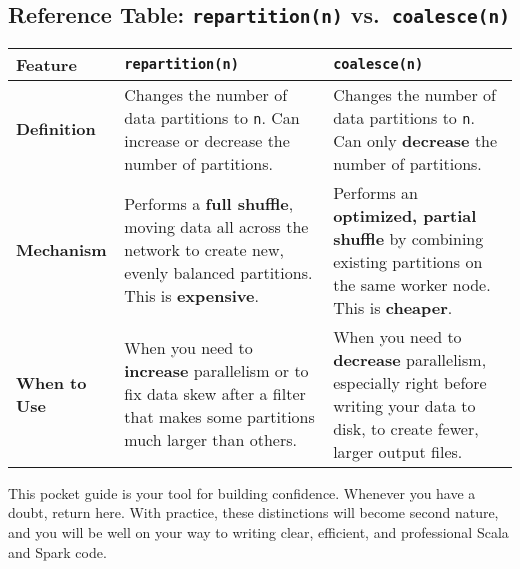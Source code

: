 \documentclass[
  letterpaper,
  DIV=11,
  numbers=noendperiod]{scrreprt}
\begin{document}
\subsection{\texorpdfstring{\textbf{Reference Table:
\texttt{repartition(n)}
vs.~\texttt{coalesce(n)}}}{Reference Table: repartition(n) vs.~coalesce(n)}}\label{reference-table-repartitionn-vs.-coalescen}

\begin{longtable}[]{@{}
  >{\raggedright\arraybackslash}p{}
  >{\raggedright\arraybackslash}p{}
  >{\raggedright\arraybackslash}p{}@{}}
\toprule\noalign{}
\begin{minipage}[b]{\linewidth}\raggedright
Feature
\end{minipage} & \begin{minipage}[b]{\linewidth}\raggedright
\texttt{repartition(n)}
\end{minipage} & \begin{minipage}[b]{\linewidth}\raggedright
\texttt{coalesce(n)}
\end{minipage} \\
\midrule\noalign{}
\endhead
\bottomrule\noalign{}
\endlastfoot
\textbf{Definition} & Changes the number of data partitions to
\texttt{n}. Can increase or decrease the number of partitions. & Changes
the number of data partitions to \texttt{n}. Can only \textbf{decrease}
the number of partitions. \\
\textbf{Mechanism} & Performs a \textbf{full shuffle}, moving data all
across the network to create new, evenly balanced partitions. This is
\textbf{expensive}. & Performs an \textbf{optimized, partial shuffle} by
combining existing partitions on the same worker node. This is
\textbf{cheaper}. \\
\textbf{When to Use} & When you need to \textbf{increase} parallelism or
to fix data skew after a filter that makes some partitions much larger
than others. & When you need to \textbf{decrease} parallelism,
especially right before writing your data to disk, to create fewer,
larger output files. \\
\end{longtable}

This pocket guide is your tool for building confidence. Whenever you
have a doubt, return here. With practice, these distinctions will become
second nature, and you will be well on your way to writing clear,
efficient, and professional Scala and Spark code.
\end{document}
